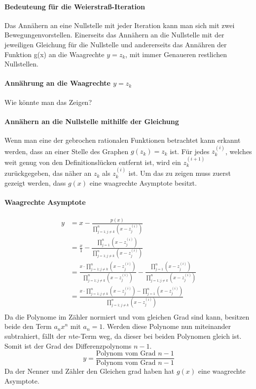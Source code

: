 \documentclass[12pt]{article}
\begin{document}
\paragraph{Bedeuteung für die Weierstraß-Iteration}
Das Annähern an eine Nullstelle mit jeder Iteration kann man sich mit zwei \glqq Bewegungen\grqq\space vorstellen. Einerseits das Annähern an die Nullstelle mit der jeweiligen Gleichung für die Nullstelle und andererseits das Annähren der Funktion g(x) an die Waagrechte $y=z_k$, mit immer Genaueren restlichen Nullstellen.

\paragraph{Annährung an die Waagrechte $y=z_k$}
Wie könnte man das Zeigen?

\paragraph{Annähern an die Nullstelle mithilfe der Gleichung}
Wenn man eine der gebrochen rationalen Funktionen betrachtet kann erkannt werden, dass an einer Stelle des Graphen $g(z_k) = z_k$ ist. Für jedes $z_k^{(i)}$, welches weit genug von den Definitionslücken entfernt ist, wird ein $z_k^{(i+1)}$ zurückgegeben, das näher an $z_k$ als $z_k^{(i)}$ ist. Um das zu zeigen muss zuerst gezeigt werden, dass $g(x)$ eine waagrechte Asymptote besitzt.
\paragraph{Waagrechte Asymptote}
\begin{align*}
    y &= x - \frac{p(x)}{\prod_{j=1;j\neq k}^{n} (x-z_j^{(i)})} \\
    &= \frac{x}{1} - \frac{\prod_{j=1}^{n} (x-z_j^{(i)})}{\prod_{j=1;j\neq k}^{n} (x-z_j^{(i)})} \\
    &= \frac{x \cdot \prod_{j=1;j\neq k}^{n} (x-z_j^{(i)})}{\prod_{j=1;j\neq k}^{n} (x-z_j^{(i)})} - \frac{\prod_{j=1}^{n} (x-z_j^{(i)})}{\prod_{j=1;j\neq k}^{n} (x-z_j^{(i)})} \\
    &= \frac{x \cdot \prod_{j=1;j\neq k}^{n} (x-z_j^{(i)}) - \prod_{j=1}^{n} (x-z_j^{(i)})}{\prod_{j=1;j\neq k}^{n} (x-z_j^{(i)})} \\
\end{align*}
Da die Polynome im Zähler normiert und vom gleichen Grad sind kann, besitzen beide den Term $a_nx^n$ mit $a_n = 1$. Werden diese Polynome nun miteinander subtrahiert, fällt der $n$te-Term weg, da dieser bei beiden Polynomen gleich ist. Somit ist der Grad des Differenzpolynoms $n-1$. \\
\begin{equation*}
    y = \frac{\text{Polynom vom Grad }n-1}{\text{Polynom vom Grad }n-1}
\end{equation*}
Da der Nenner und Zähler den Gleichen grad haben hat $g(x)$ eine waagrechte Asymptote.
\end{document}
